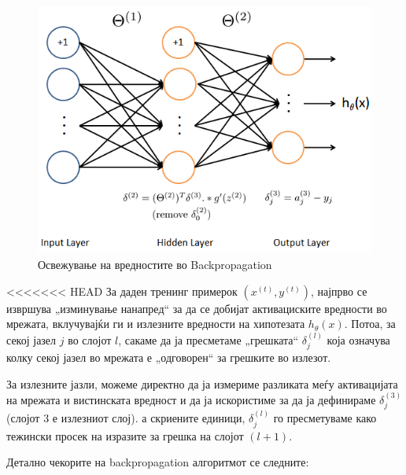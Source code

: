 \begin{figure}[htb]
\centering
\includegraphics[width=.9\textwidth]{src/neuralNetwork2/nnb}
\caption{Освежување на вредностите во Backpropagation}
\label{fig:backpropagation}
\end{figure}

<<<<<<< HEAD
За даден тренинг примерок $(x^{(t)}, y^{(t)})$, најпрво се извршува „изминување
нанапред“ за да се добијат активациските вредности во мрежата, вклучувајќи ги и
излезните вредности на хипотезата $h_\theta(x)$. Потоа, за секој јазел $j$ во
слојот $l$, сакаме да ја пресметаме „грешката“ $\delta_j^{(l)}$ која означува
колку секој јазел во мрежата е „одговорен“ за грешките во излезот.

За излезните јазли, можеме директно да ја измериме разликата меѓу активацијата
на мрежата и вистинската вредност и да ја искористиме за да ја дефинираме
$\delta_j^{(3)}$ (слојот 3 е излезниот слој). а скриените единици,
$\delta_j^{(l)}$ го пресметуваме како тежински просек на изразите за грешка на
слојот $(l + 1)$.

Детално чекорите на backpropagation алгоритмот се следните:


